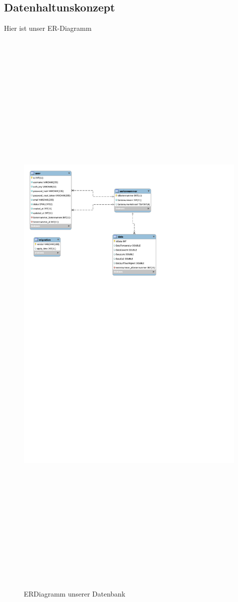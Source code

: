 \subsection{Datenhaltunskonzept}
Hier ist unser ER-Diagramm
	\begin{figure}
	\includegraphics[height=1000pt]{figures/ERDiagramm}
	\caption{ERDiagramm unserer Datenbank}
	\end{figure}
